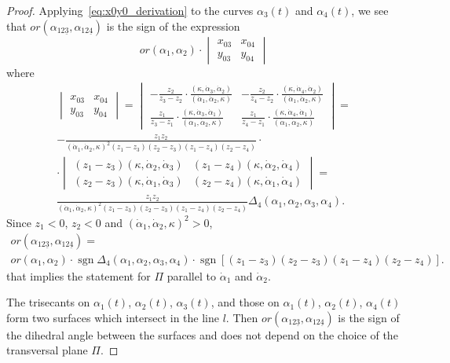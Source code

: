 \documentclass{article}
\theoremstyle{definition}
\theoremstyle{remark}
\DeclareMathOperator{\sgn}{\mathrm{sgn}}
\begin{document}
\begin{proof}
Applying~\eqref{eq:x0y0_derivation} to the curves $\alpha_3(t)$ and $\alpha_4(t)$, we see that $or(\alpha_{12\underline{3}},\alpha_{12\underline{4}})$ is the sign of the expression
\[
or(\alpha_1,\alpha_2)\cdot\begin{vmatrix}
                                 x_{03} & x_{04}\\ y_{03} & y_{04}
                             \end{vmatrix}
\]
where
\begin{multline*}
\begin{vmatrix}
x_{03} & x_{04}\\ y_{03} & y_{04}
\end{vmatrix}=
\begin{vmatrix}
   -\frac{z_2}{z_3-z_2}\cdot\frac{(\kappa,\dot\alpha_3,\dot\alpha_2)}{(\dot\alpha_1,\dot\alpha_2,\kappa)} & -\frac{z_2}{z_4-z_2}\cdot\frac{(\kappa,\dot\alpha_4,\dot\alpha_2)}{(\dot\alpha_1,\dot\alpha_2,\kappa)} \\
  \frac{z_1}{z_3-z_1}\cdot\frac{(\kappa,\dot\alpha_3,\dot\alpha_1)}{(\dot\alpha_1,\dot\alpha_2,\kappa)} & \frac{z_1}{z_4-z_1}\cdot\frac{(\kappa,\dot\alpha_4,\dot\alpha_1)}{(\dot\alpha_1,\dot\alpha_2,\kappa)}
\end{vmatrix}=\\
-\frac{z_1z_2}{(\dot\alpha_1,\dot\alpha_2,\kappa)^2(z_1-z_3)(z_2-z_3)(z_1-z_4)(z_2-z_4)}\cdot\\
\cdot\begin{vmatrix}
   (z_1-z_3)(\kappa,\dot\alpha_2,\dot\alpha_3) & (z_1-z_4)(\kappa,\dot\alpha_2,\dot\alpha_4) \\
  (z_2-z_3)(\kappa,\dot\alpha_1,\dot\alpha_3) & (z_2-z_4)(\kappa,\dot\alpha_1,\dot\alpha_4)
\end{vmatrix}=\\
\frac{z_1z_2}{(\dot\alpha_1,\dot\alpha_2,\kappa)^2(z_1-z_3)(z_2-z_3)(z_1-z_4)(z_2-z_4)}\Delta_4(\alpha_1,\alpha_2,\alpha_3,\alpha_4).
\end{multline*}
Since $z_1<0$,  $z_2<0$ and $(\dot\alpha_1,\dot\alpha_2,\kappa)^2>0$,
\begin{multline*}
or(\alpha_{12\underline{3}},\alpha_{12\underline{4}})=\\
or(\alpha_1,\alpha_2)\cdot\sgn\Delta_4(\alpha_1,\alpha_2,\alpha_3,\alpha_4)
\cdot\sgn[(z_1-z_3)(z_2-z_3)(z_1-z_4)(z_2-z_4)].
\end{multline*}
that implies the statement for $\Pi$ parallel to $\dot\alpha_1$ and $\dot\alpha_2$.

The trisecants on $\alpha_1(t)$, $\alpha_2(t)$, $\alpha_3(t)$, and those on $\alpha_1(t)$, $\alpha_2(t)$, $\alpha_4(t)$ form two surfaces which intersect in the line $l$. Then $or(\alpha_{12\underline{3}},\alpha_{12\underline{4}})$ is the sign of the dihedral angle between the surfaces and does not depend on the choice of the transversal plane $\Pi$.
\end{proof}
\end{document}
